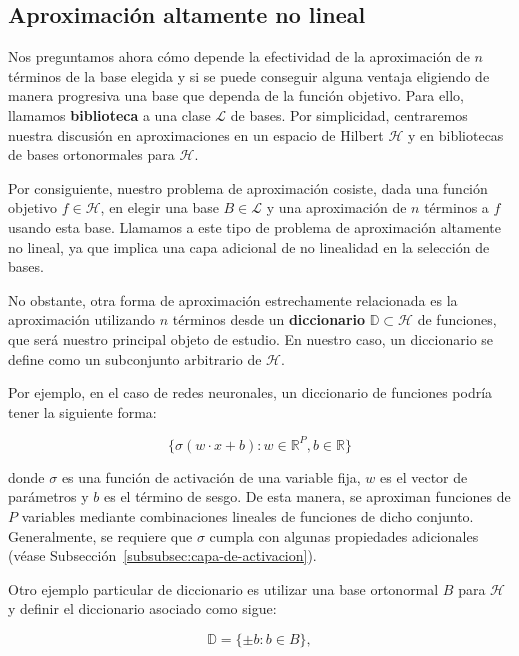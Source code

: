 \subsection{Aproximación altamente no lineal}

Nos preguntamos ahora cómo depende la efectividad de la aproximación de $n$ términos de la base elegida y si se puede conseguir alguna ventaja eligiendo de manera progresiva una base que dependa de la función objetivo. Para ello, llamamos \textbf{biblioteca} a una clase $\mathcal{L}$ de bases. Por simplicidad, centraremos nuestra discusión en aproximaciones en un espacio de Hilbert $\mathcal{H}$ y en bibliotecas de bases ortonormales para $\mathcal{H}$.\newline

Por consiguiente, nuestro problema de aproximación cosiste, dada una función objetivo $f \in \mathcal{H}$, en elegir una base $B \in \mathcal{L}$ y una aproximación de $n$ términos a $f$ usando esta base. Llamamos a este tipo de problema de aproximación altamente no lineal, ya que implica una capa adicional de no linealidad en la selección de bases.\newline

No obstante, otra forma de aproximación estrechamente relacionada es la aproximación utilizando $n$ términos desde un \textbf{diccionario} $\mathbb{D} \subset \mathcal{H}$ de funciones, que será nuestro principal objeto de estudio. En nuestro caso, un diccionario se define como un subconjunto arbitrario de $\mathcal{H}$.\newline

Por ejemplo, en el caso de redes neuronales, un diccionario de funciones podría tener la siguiente forma:

\[
    \{ \sigma(w \cdot x + b) : w \in \mathbb{R}^{P}, b \in \mathbb{R} \}
\]

donde $\sigma$ es una función de activación de una variable fija, $w$ es el vector de parámetros y $b$ es el término de sesgo. De esta manera, se aproximan funciones de $P$ variables mediante combinaciones lineales de funciones de dicho conjunto. Generalmente, se requiere que $\sigma$ cumpla con algunas propiedades adicionales (véase Subsección~\ref{subsubsec:capa-de-activacion}).\newline

Otro ejemplo particular de diccionario es utilizar una base ortonormal $B$ para $\mathcal{H}$ y definir el diccionario asociado como sigue:

\[
    \mathbb{D} = \{\pm b : b \in B\},
\]

